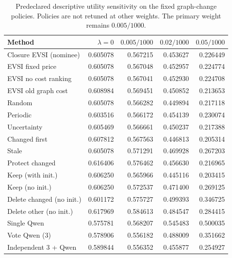\begin{table}[t]
\centering\small
\begin{tabular}{lrrrr}
\toprule
Method & $\lambda=0$ & $0.005/1000$ & $0.02/1000$ & $0.05/1000$ \\
\midrule
Closure EVSI (nominee) & 0.605078 & 0.567215 & 0.453627 & 0.226449 \\
EVSI fixed price & 0.605078 & 0.567048 & 0.452957 & 0.224774 \\
EVSI no cost ranking & 0.605078 & 0.567041 & 0.452930 & 0.224708 \\
EVSI old graph cost & 0.608984 & 0.569451 & 0.450852 & 0.213653 \\
Random & 0.605078 & 0.566282 & 0.449894 & 0.217118 \\
Periodic & 0.603516 & 0.566172 & 0.454139 & 0.230074 \\
Uncertainty & 0.605469 & 0.566661 & 0.450237 & 0.217388 \\
Changed first & 0.607812 & 0.567563 & 0.446813 & 0.205314 \\
Stale & 0.605078 & 0.571291 & 0.469928 & 0.267203 \\
Protect changed & 0.616406 & 0.576462 & 0.456630 & 0.216965 \\
Keep (with init.) & 0.606250 & 0.565966 & 0.445116 & 0.203415 \\
Keep (no init.) & 0.606250 & 0.572537 & 0.471400 & 0.269125 \\
Delete changed (no init.) & 0.601172 & 0.575727 & 0.499393 & 0.346725 \\
Delete other (no init.) & 0.617969 & 0.584613 & 0.484547 & 0.284415 \\
Single Qwen & 0.575781 & 0.568207 & 0.545483 & 0.500035 \\
Vote Qwen (3) & 0.578906 & 0.556182 & 0.488009 & 0.351662 \\
Independent 3 + Qwen & 0.589844 & 0.556352 & 0.455877 & 0.254927 \\
\bottomrule
\end{tabular}
\caption{Predeclared descriptive utility sensitivity on the fixed graph-change policies. Policies are not retuned at other weights. The primary weight remains $0.005/1000$.}
\label{tab:weights}
\end{table}
